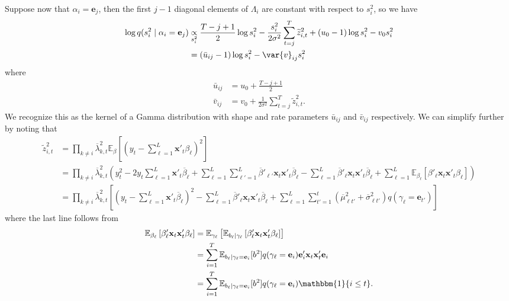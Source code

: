 \documentclass{article}
\newcommand{\E}{\mathbb{E}}
\begin{document}
\begin{itemize}
Suppose now that $\alpha_i = \mathbf{e}_j$, then the first $j-1$ diagonal elements of $\Lambda_i$ are constant with respect to $s_i^2$, so we have
\begin{align*}
    \log q(s_i^2\;|\;\alpha_i = \mathbf{e}_j) &\underset{s_i^2}{\propto} \frac{T - j + 1}{2}  \log s_i^2
    - \frac{s_i^2}{2\sigma^2} \sum_{t=j}^T \widetilde{z}_{i,t}^2 + (u_0 - 1) \log s_i^2 - v_0 s_i^2 \\
    &= (\bar{u}_{ij} - 1) \log s_i^2 - \var{v}_{ij} s_i^2
\end{align*}
where 
\begin{align*}
    \bar{u}_{ij} &= u_0 + \frac{T - j + 1}{2} \\
    \bar{v}_{ij} &= v_0 + \frac{1}{2\sigma^2} \sum_{t=j}^T \widetilde{z}_{i,t}^2.
\end{align*}
We recognize this as the kernel of a Gamma distribution with shape and rate parameters $\bar{u}_{ij}$ and $\bar{v}_{ij}$ respectively. We can simplify further by noting that
\begin{align*}
    \widetilde{z}_{i,t}^2 &= \prod_{k\neq i} \overline{\lambda}^2_{k,t}\E_\beta\left[\left(y_t - \sum_{\ell=1}^L \mathbf{x}'_t\beta_\ell\right)^2\right] \\
    &= \prod_{k\neq i} \overline{\lambda}^2_{k,t}\left(y_t^2 - 2 y_t \sum_{\ell=1}^L \mathbf{x}'_t \overline{\beta}_\ell + \sum_{\ell = 1}^L\sum_{\ell'=1}^L \overline{\beta}'_{\ell'} \mathbf{x}_t\mathbf{x}'_t \overline{\beta}_\ell - \sum_{\ell=1}^L \overline{\beta}'_{\ell} \mathbf{x}_t\mathbf{x}'_t \overline{\beta}_\ell + \sum_{\ell=1}^L\E_{\beta_\ell}\left[\beta'_{\ell} \mathbf{x}_t\mathbf{x}'_t\beta_\ell\right]\right) \\
    &= \prod_{k\neq i} \overline{\lambda}^2_{k,t}\left[\left(y_t - \sum_{\ell=1}^L \mathbf{x}'_t\overline{\beta}_\ell\right)^2 - \sum_{\ell=1}^L \overline{\beta}'_{\ell} \mathbf{x}_t\mathbf{x}'_t \overline{\beta}_\ell + \sum_{\ell=1}^L\sum_{t'=1}^t (\overline{\mu}_{\ell t'}^2 + \overline{\sigma}_{\ell t'}^2) q(\gamma_\ell = \mathbf{e}_{t'})\right]
\end{align*}
where the last line follows from 
\begin{align*}
    \E_{\beta_\ell}\left[\beta'_{\ell} \mathbf{x}_t\mathbf{x}'_t\beta_\ell\right] &= \E_{\gamma_\ell}\left[\E_{b_\ell|\gamma_\ell}\left[ \beta'_\ell \mathbf{x}_t\mathbf{x}'_t\beta_\ell\right]\right] \\
    &= \sum_{i=1}^T \E_{b_\ell|\gamma_\ell = \mathbf{e}_i}[b^2]q(\gamma_\ell = \mathbf{e}_i)\mathbf{e}'_i\mathbf{x}_t\mathbf{x}'_t\mathbf{e}_i \\
    &= \sum_{i=1}^T \E_{b_\ell|\gamma_\ell = \mathbf{e}_i}[b^2]q(\gamma_\ell = \mathbf{e}_i)\mathbbm{1}\{i \leq t\}.
\end{align*}


\end{itemize}
\end{document}
